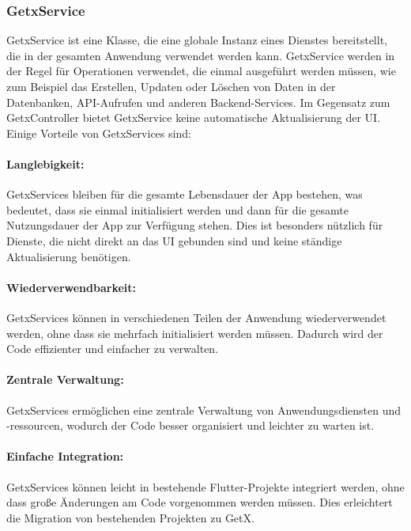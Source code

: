 \subsubsection{GetxService}
GetxService ist eine Klasse, die eine globale Instanz eines Dienstes bereitstellt, die in der gesamten Anwendung verwendet werden kann. GetxService werden in der Regel für Operationen verwendet, die einmal ausgeführt werden müssen, wie zum Beispiel das Erstellen, Updaten oder Löschen von Daten in der Datenbanken, API-Aufrufen und anderen Backend-Services. Im Gegensatz zum GetxController bietet GetxService keine automatische Aktualisierung der UI.
\\
Einige Vorteile von GetxServices sind:
\\
\paragraph{Langlebigkeit:}
GetxServices bleiben für die gesamte Lebensdauer der App bestehen, was bedeutet, dass sie einmal initialisiert werden und dann für die gesamte Nutzungsdauer der App zur Verfügung stehen. Dies ist besonders nützlich für Dienste, die nicht direkt an das UI gebunden sind und keine ständige Aktualisierung benötigen.
\\
\paragraph{Wiederverwendbarkeit:}
GetxServices können in verschiedenen Teilen der Anwendung wiederverwendet werden, ohne dass sie mehrfach initialisiert werden müssen. Dadurch wird der Code effizienter und einfacher zu verwalten.
\\
\paragraph{Zentrale Verwaltung:}
GetxServices ermöglichen eine zentrale Verwaltung von Anwendungsdiensten und -ressourcen, wodurch der Code besser organisiert und leichter zu warten ist.
\\
\paragraph{Einfache Integration:}
GetxServices können leicht in bestehende Flutter-Projekte integriert werden, ohne dass große Änderungen am Code vorgenommen werden müssen. Dies erleichtert die Migration von bestehenden Projekten zu GetX.

